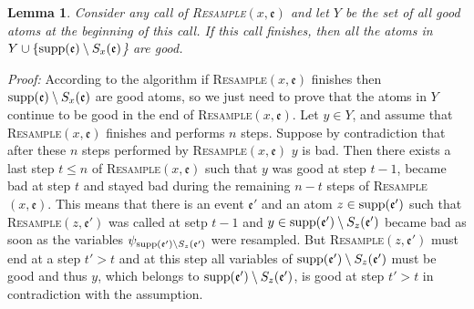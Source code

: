 \documentclass[11pt]{article}
\newtheorem{lem}[theo]{Lemma}
\let\\=\noindent
\let\\=\noindent
\def\obj{{\rm supp}}
\def\ev{{\mathfrak{e}}}
\def\0{\emptyset}
\begin{document}
\begin{lem}\label{Agood2}
Consider any call of \textsc{Resample}$(x,\ev)$ and  let $Y$ be the set of all good atoms at the beginning of this call. If this call finishes, then all the atoms  in $Y\cup \{\obj(\ev) \setminus S_x(\ev)$\} are good.
\end{lem}
{\it Proof:} According to the algorithm if \textsc{Resample}$(x,\ev)$ finishes then $\obj(\ev)\setminus S_x(\ev)$ are good atoms, so we just need to prove that the atoms  in $Y$ continue to be  good in the end of \textsc{Resample}$(x,\ev)$. Let $y\in  Y$, and assume that \textsc{Resample}$(x,\ev)$ finishes and performs $n$ steps. Suppose by contradiction that after these $n$ steps performed
by \textsc{Resample}$(x,\ev)$  $y$ is bad.
Then there exists a last step $t\le n$ of \textsc{Resample}$(x,\ev)$  such that $y$ was good at step $t-1$, became  bad  at step $t$ and stayed  bad during the remaining $n-t$ steps of \textsc{Resample}$(x,\ev)$.
This means that there is an event $\ev'$ and an atom $z\in \obj(\ev')$ such that \textsc{Resample}$(z,\ev')$ was called at setp $t-1$ and $y\in \obj(\ev')\setminus S_z(\ev')$ became bad as soon as the variables
 $\psi_{\obj(\ev')\setminus S_z(\ev')}$  were resampled. But   \textsc{Resample}$(z,\ev')$ must end at a step $t'>t$ and at this step all variables of $\obj(\ev')\setminus S_z(\ev')$ must be good and thus
$y$, which belongs to $\obj(\ev')\setminus S_z(\ev')$, is good at step $t'>t$ in contradiction with the assumption.






%
\end{document}
